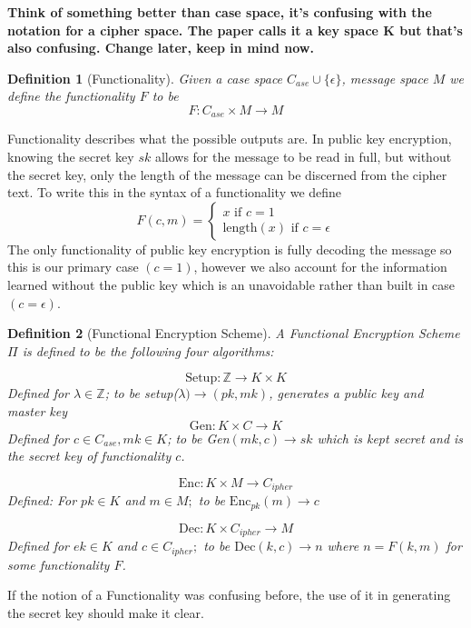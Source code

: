 \documentclass[12pt,twoside]{reedthesis}
\newtheorem{definition}{Definition}
\newcommand{\enc}[0]{\text{Enc}}
\newcommand{\dec}[0]{\text{Dec}}
\newcommand{\Z}[0]{\mathbb{Z}}
\begin{document}
\begin{center}
\textbf{Think of something better than case space, it's confusing with the notation for a cipher space. The paper calls it a key space K but that's also confusing. Change later, keep in mind now.}
\end{center}


\begin{definition}[Functionality]
Given a case space $C_{ase} \cup \{\epsilon\}$, message space $M$ we define the functionality $F$ to be 
$$F:C_{ase} \times M \rightarrow M$$
\end{definition}

\par Functionality describes what the possible outputs are. In public key encryption, knowing the secret key $sk$ allows for the message to be read in full, but without the secret key, only the length of the message can be discerned from the cipher text. To write this in the syntax of a functionality we define
$$
F(c,m) = 
\begin{cases}
 x \text{ if } c = 1 \\
\text{length}(x) \text{ if } c = \epsilon
\end{cases}
$$
The only functionality of public key encryption is fully decoding the message so this is our primary case $(c = 1)$, however we also account for the information learned without the public key which is an unavoidable rather than built in case $(c = \epsilon)$.


\begin{definition}[Functional Encryption Scheme]
A Functional Encryption Scheme $\Pi$ is defined to be the following four algorithms:

$$\text{Setup}: \Z \rightarrow K \times K$$
Defined for $\lambda \in \Z$; to be setup($\lambda) \rightarrow (pk,mk)$, generates a public key and master key
$$\text{Gen}: K \times C \rightarrow K $$
Defined for $c\in C_{ase}, mk \in K$; to be Gen$(mk,c) \rightarrow sk$ which is kept secret and is the secret key of functionality $c$.

$$\enc: K \times M \rightarrow C_{ipher}$$
Defined: For $pk\in K$ and $m \in M;$ to be $\enc_{pk}(m) \rightarrow c$

$$\dec:K \times C_{ipher} \rightarrow M$$
Defined for $ek \in K$ and $c \in C_{ipher};$ to be $\dec(k,c) \rightarrow n$ where $n = F(k,m)$ for some functionality $F$. 
\end{definition}


If the notion of a Functionality was confusing before, the use of it in generating the secret key should make it clear.
\end{document}
